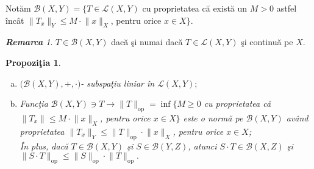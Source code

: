 \documentclass[ a4paper, 12pt]{report}
\newtheorem{prop}[theorem]{\bf Propozi\c tia }
\theoremstyle{definition}
\theoremstyle{remark}
\newtheorem{remarc}{\bf Remarca}[section]
\numberwithin{equation}{section}
\begin{document}
Not\u am $\mathcal{B}(X,Y) = \{ T \in \mathcal{L}(X,Y)$ cu proprietatea c\u a  exist\u a  un $M>0$ astfel \^inc\^at $\lVert T_x \rVert_{Y} \leq M \cdot \lVert x \rVert_{X}$, pentru orice $x \in X \}.$
\begin{remarc}
$T \in \mathcal{B}(X,Y) $ dac\u a \c si numai dac\u a $T \in \mathcal{L}(X,Y)$ \c si continu\u a pe $X$.
\end{remarc}
\begin{prop}
\begin{enumerate}[(a)]
\item $\Big(\mathcal{B}(X,Y), +, \cdot\Big)$- subspa\c tiu liniar \^in $\mathcal{L}(X,Y);$
\item Func\c tia $\mathcal{B}(X,Y) \ni T \longrightarrow \lVert T \rVert_{\mbox{op}} = \inf \{ M \geq 0$ cu proprietatea c\u a $\lVert T_x \rVert \leq M \cdot \lVert x \rVert_{X}$, pentru orice $x \in X\}$ este o norm\u a pe $\mathcal{B}(X,Y)$ av\^and proprietatea $\lVert T_x \rVert_{Y} \leq \lVert T \rVert_{\mbox{op}} \cdot \lVert x \rVert_{X}$, pentru orice $x \in X$;\\
\^In plus, dac\u a $T \in \mathcal{B}(X,Y)$ \c si $S \in \mathcal{B}(Y,Z)$, atunci $S \cdot T \in \mathcal{B}(X,Z)$ \c si $\lVert S \cdot T \rVert_{\mbox{op}} \leq \lVert S \rVert_{\mbox{op}} \cdot \lVert T \rVert_{\mbox{op}}.$
\end{enumerate}







\end{prop}
\end{document}
